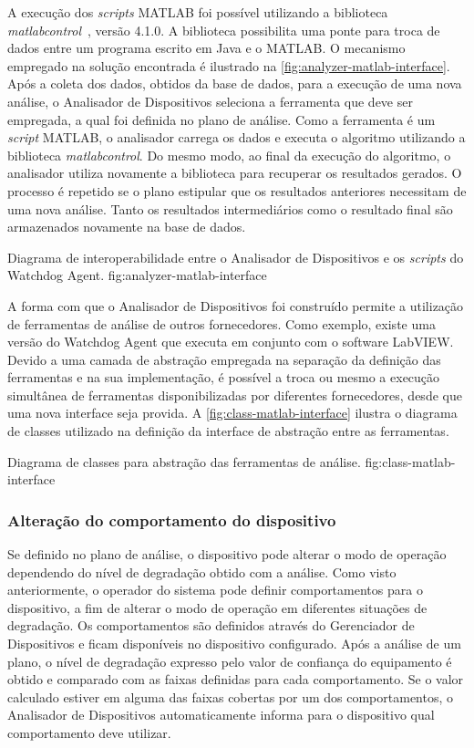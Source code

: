 A execução dos \textit{scripts} MATLAB foi possível utilizando a biblioteca
\emph{matlabcontrol}~\cite{matlabcontrol2013homepage}, versão 4.1.0. A biblioteca possibilita uma
ponte para troca de dados entre um programa escrito em Java e o MATLAB. O mecanismo empregado na
solução encontrada é ilustrado na \cref{fig:analyzer-matlab-interface}. Após a coleta dos dados,
obtidos da base de dados, para a execução de uma nova análise, o Analisador de Dispositivos
seleciona a ferramenta que deve ser empregada, a qual foi definida no plano de análise. Como a
ferramenta é um \textit{script} MATLAB, o analisador carrega os dados e executa o algoritmo
utilizando a biblioteca
\emph{matlabcontrol}. Do mesmo modo, ao final da execução do algoritmo, o analisador utiliza
novamente a biblioteca para recuperar os resultados gerados. O processo é repetido se o plano
estipular que os resultados anteriores necessitam de uma nova análise. Tanto os resultados
intermediários como o resultado final são armazenados novamente na base de dados.

  {Diagrama de interoperabilidade entre o Analisador de Dispositivos e os \textit{scripts} do
      Watchdog Agent.}
  {fig:analyzer-matlab-interface}

A forma com que o Analisador de Dispositivos foi construído permite a utilização de ferramentas de
análise de outros fornecedores. Como exemplo, existe uma versão do Watchdog Agent que executa em
conjunto com o software LabVIEW. Devido a uma camada de abstração empregada na separação da
definição das ferramentas e na sua implementação, é possível a troca ou mesmo a execução simultânea
de ferramentas disponibilizadas por diferentes fornecedores, desde que uma nova interface seja
provida. A \cref{fig:class-matlab-interface} ilustra o diagrama de classes utilizado na definição da
interface de abstração entre as ferramentas.

  {Diagrama de classes para abstração das ferramentas de análise.}
  {fig:class-matlab-interface}


\subsubsection{Alteração do comportamento do dispositivo}

Se definido no plano de análise, o dispositivo pode alterar o modo de operação dependendo do nível
de degradação obtido com a análise. Como visto anteriormente, o operador do sistema pode definir
comportamentos para o dispositivo, a fim de alterar o modo de operação em diferentes situações de
degradação. Os comportamentos são definidos através do Gerenciador de Dispositivos e ficam
disponíveis no dispositivo configurado. Após a análise de um plano, o nível de degradação expresso
pelo valor de confiança do equipamento é obtido e comparado com as faixas definidas para cada
comportamento. Se o valor calculado estiver em alguma das faixas cobertas por um dos comportamentos,
o Analisador de Dispositivos automaticamente informa para o dispositivo qual comportamento deve
utilizar.


